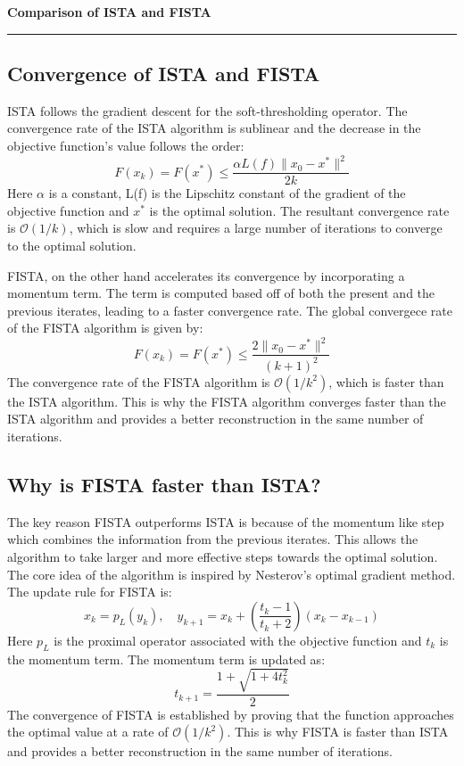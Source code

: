 \documentclass[a4paper,12pt]{article}
\newenvironment{solution}[2][]{%
    \begin{mdframed}[linecolor=blue!70!black, linewidth=2pt, roundcorner=10pt, backgroundcolor=yellow!10!white, skipabove=12pt, skipbelow=12pt]%
        \textbf{\large #2}
        \par\noindent\rule{\textwidth}{0.4pt}
}{
    \end{mdframed}
}
\begin{document}
\begin{solution}{Comparison of ISTA and FISTA}
  \subsection{Convergence of ISTA and FISTA}
  ISTA follows the gradient descent for the soft-thresholding operator. The convergence rate of the ISTA algorithm is sublinear and the decrease in the objective function's value follows the order:
  \begin{equation}
    F(x_k) = F(x^*) \leq \displaystyle\frac{\alpha L(f)\|x_0 - x^*\|^2}{2k}
  \end{equation}
  \noindent Here $\alpha$ is a constant, L(f) is the Lipschitz constant of the gradient of the objective function and $x^*$ is the optimal solution. The resultant convergence rate is $\mathcal{O}(1/k)$, which is slow and requires a large number of iterations to converge to the optimal solution.

  \noindent FISTA, on the other hand accelerates its convergence by incorporating a momentum term. The term is computed based off of both the present and the previous iterates, leading to a faster convergence rate. The global convergece rate of the FISTA algorithm is given by:
  \begin{equation}
    F(x_k) = F(x^*) \leq \displaystyle\frac{2\|x_0 - x^*\|^2}{(k+1)^2}
  \end{equation}
  \noindent The convergence rate of the FISTA algorithm is $\mathcal{O}(1/k^2)$, which is faster than the ISTA algorithm. This is why the FISTA algorithm converges faster than the ISTA algorithm and provides a better reconstruction in the same number of iterations.

  \subsection{Why is FISTA faster than ISTA?}
  The key reason FISTA outperforms ISTA is because of the momentum like step which combines the information from the previous iterates. This allows the algorithm to take larger and more effective steps towards the optimal solution. The core idea of the algorithm is inspired by Nesterov's optimal gradient method. The update rule for FISTA is:
  \begin{equation}
    x_k = p_L(y_k), \quad y_{k + 1} = x_k + \left( \displaystyle\frac{t_k - 1}{t_k + 2}\right) (x_k - x_{k-1})
  \end{equation}
  \noindent Here $p_L$ is the proximal operator associated with the objective function and $t_k$ is the momentum term. The momentum term is updated as:
  \begin{equation}
    t_{k+1} = \displaystyle\frac{1 + \sqrt{1 + 4t_k^2}}{2}
  \end{equation}
  \noindent The convergence of FISTA is established by proving that the function approaches the optimal value at a rate of $\mathcal{O}(1/k^2)$. This is why FISTA is faster than ISTA and provides a better reconstruction in the same number of iterations.


\end{solution}
\end{document}
